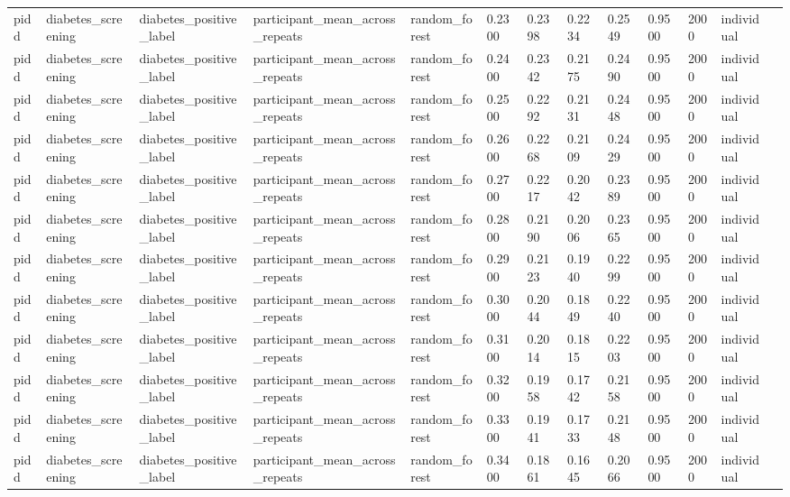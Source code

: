 \begin{tabular}{lllllllllllll}
pidd & diabetes\_screening & diabetes\_positive\_label & participant\_mean\_across\_repeats & random\_forest & 0.2300 & 0.2398 & 0.2234 & 0.2549 & 0.9500 & 2000 & individual &  \\
pidd & diabetes\_screening & diabetes\_positive\_label & participant\_mean\_across\_repeats & random\_forest & 0.2400 & 0.2342 & 0.2175 & 0.2490 & 0.9500 & 2000 & individual &  \\
pidd & diabetes\_screening & diabetes\_positive\_label & participant\_mean\_across\_repeats & random\_forest & 0.2500 & 0.2292 & 0.2131 & 0.2448 & 0.9500 & 2000 & individual &  \\
pidd & diabetes\_screening & diabetes\_positive\_label & participant\_mean\_across\_repeats & random\_forest & 0.2600 & 0.2268 & 0.2109 & 0.2429 & 0.9500 & 2000 & individual &  \\
pidd & diabetes\_screening & diabetes\_positive\_label & participant\_mean\_across\_repeats & random\_forest & 0.2700 & 0.2217 & 0.2042 & 0.2389 & 0.9500 & 2000 & individual &  \\
pidd & diabetes\_screening & diabetes\_positive\_label & participant\_mean\_across\_repeats & random\_forest & 0.2800 & 0.2190 & 0.2006 & 0.2365 & 0.9500 & 2000 & individual &  \\
pidd & diabetes\_screening & diabetes\_positive\_label & participant\_mean\_across\_repeats & random\_forest & 0.2900 & 0.2123 & 0.1940 & 0.2299 & 0.9500 & 2000 & individual &  \\
pidd & diabetes\_screening & diabetes\_positive\_label & participant\_mean\_across\_repeats & random\_forest & 0.3000 & 0.2044 & 0.1849 & 0.2240 & 0.9500 & 2000 & individual &  \\
pidd & diabetes\_screening & diabetes\_positive\_label & participant\_mean\_across\_repeats & random\_forest & 0.3100 & 0.2014 & 0.1815 & 0.2203 & 0.9500 & 2000 & individual &  \\
pidd & diabetes\_screening & diabetes\_positive\_label & participant\_mean\_across\_repeats & random\_forest & 0.3200 & 0.1958 & 0.1742 & 0.2158 & 0.9500 & 2000 & individual &  \\
pidd & diabetes\_screening & diabetes\_positive\_label & participant\_mean\_across\_repeats & random\_forest & 0.3300 & 0.1941 & 0.1733 & 0.2148 & 0.9500 & 2000 & individual &  \\
pidd & diabetes\_screening & diabetes\_positive\_label & participant\_mean\_across\_repeats & random\_forest & 0.3400 & 0.1861 & 0.1645 & 0.2066 & 0.9500 & 2000 & individual &  \\

\end{tabular}
